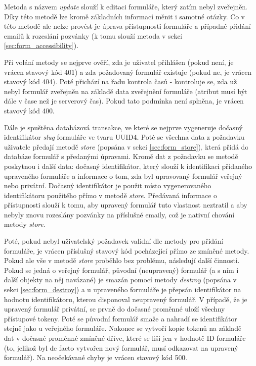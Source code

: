 			Metoda s názvem \textit{update} slouží k editaci formuláře, který zatím nebyl zveřejněn. Díky této metodě lze kromě základních informací měnit i samotné otázky. Co v této metodě ale nelze provést je úprava přístupnosti formuláře a případné přidání emailů k rozeslání pozvánky (k tomu slouží metoda v sekci \ref{sec:form_accessibility}).
			
			Při volání metody se nejprve ověří, zda je uživatel přihlášen (pokud není, je vrácen stavový kód 401) a zda požadovaný formulář existuje (pokud ne, je vrácen stavový kód 404). Poté přichází na řadu kontrola časů - kontroluje se, zda už nebyl formulář zveřejněn na základě data zveřejnění formuláře (atribut musí být dále v čase než je serverový čas). Pokud tato podmínka není splněna, je vrácen stavový kód 400.
			
			Dále je spuštěna databázová transakce, ve které se nejprve vygeneruje dočasný identifikátor \textit{slug} formuláře ve tvaru UUID4. Poté se všechna data z požadavku uživatele předají metodě \textit{store} (popsána v sekci \ref{sec:form_store}), která přidá do databáze formulář s předanými úpravami. Kromě dat z požadavku se metodě poskytnou i další data: dočasný identifikátor, který slouží k identifikaci přidaného upraveného formuláře a informace o tom, zda byl upravovaný formulář veřejný nebo privátní. Dočasný identifikátor je použit místo vygenerovaného identifikátoru použitého přímo v metodě \textit{store}. Předávaná informace o přístupnosti slouží k tomu, aby upravený formulář tuto vlastnost neztratil a aby nebyly znovu rozeslány pozvánky na příslušné emaily, což je nativní chování metody \textit{store}. 
			
			Poté, pokud nebyl uživatelský požadavek validní dle metody pro přidání formuláře, je vrácen příslušný stavový kód pocházející přímo ze zmíněné metody. Pokud ale vše v metodě \textit{store} proběhlo bez problému, následují další činnosti. Pokud se jedná o veřejný formulář, původní (neupravený) formulář (a s ním i další objekty na něj navázané) je smazán pomocí metody \textit{destroy} (popsána v sekci \ref{sec:form_destroy}) a u upraveného formuláře je přepsán identifikátor na hodnotu identifikátoru, kterou disponoval neupravený formulář. V případě, že je upravený formulář privátní, se prvně do dočasné proměnné uloží všechny přístupové tokeny. Poté se původní formulář smaže a nahradí se identifikátor stejně jako u veřejného formuláře. Nakonec se vytvoří kopie tokenů na základě dat v dočasné proměnné zmíněné dříve, které se liší jen v hodnotě ID formuláře (to, jelikož byl de facto vytvořen nový formulář, musí odkazovat na upravený formulář). Na neočekávané chyby je vrácen stavový kód 500.
			
